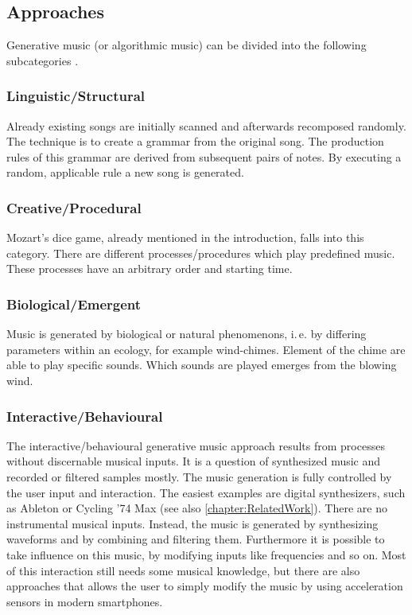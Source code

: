 	\subsection{Approaches} 

	Generative music (or algorithmic music) can be divided into the following subcategories \cite{Wooller2005}.

	\subsubsection{Linguistic/Structural}

	Already existing songs are initially scanned and afterwards recomposed randomly. 
	The technique is to create a grammar from the original song. The production rules of this grammar are derived from subsequent pairs of notes. By executing a random, applicable rule a new song is generated.

	\subsubsection{Creative/Procedural}

	Mozart's dice game, already mentioned in the introduction, falls into this category.
	There are different processes/procedures which play predefined music. These processes have an arbitrary order and starting time. 

	\subsubsection{Biological/Emergent}

	Music is generated by biological or natural phenomenons, i.\,e. by differing parameters within an ecology, for example wind-chimes. Element of the chime are able to play specific sounds. Which sounds are played emerges from the blowing wind.

	\subsubsection{Interactive/Behavioural}

	The interactive/behavioural generative music approach results from processes without discernable musical inputs. It is a question of synthesized music and recorded or filtered samples mostly. The music generation is fully controlled by the user input and interaction. 
	The easiest examples are digital synthesizers, such as Ableton or Cycling '74 Max (see also \ref{chapter:RelatedWork}). There are no instrumental musical inputs. Instead, the music is generated by synthesizing waveforms and by combining and filtering them. Furthermore it is possible to take influence on this music, by modifying inputs like frequencies and so on. Most of this interaction still needs some musical knowledge, but there are also approaches that allows the user to simply modify the music by using acceleration sensors in modern smartphones.
	
